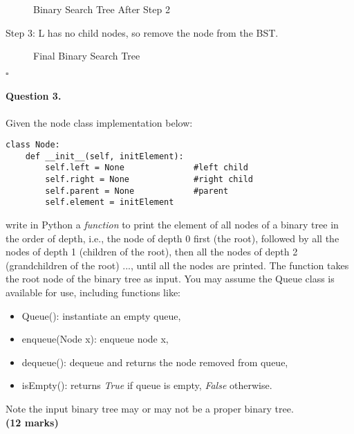 \documentclass[12pt]{article}
\newcommand{\EOQ}{\hfill $\square$}
\begin{document}
\begin{enumerate}[(a)]
\begin{figure}[H]
\begin{tikzpicture}
			\end{tikzpicture}
			\caption{Binary Search Tree After Step 2}
			\label{fig:BSTS2}
		\end{figure}
		Step 3: L has no child nodes, so remove the node from the BST.
		\begin{figure}[H]
					\centering
					\caption{Final Binary Search Tree}
					\label{fig:BSTF}
				\end{figure}\EOQ
\end{enumerate}
\newpage
\paragraph{Question 3.} Given the node class implementation below:
\begin{verbatim}
class Node:
    def __init__(self, initElement):
        self.left = None              #left child
        self.right = None             #right child
        self.parent = None            #parent
        self.element = initElement
\end{verbatim}
write in Python a \textit{function} to print the element of all nodes of a binary tree in the order of depth, i.e., the node of depth 0 first (the root), followed by all the nodes of depth 1 (children of the root), then all the nodes of depth 2 (grandchildren of the root) ..., until all the nodes are printed. The function takes the root node of the binary tree as input. You may assume the Queue class is available for use, including functions like:
\begin{itemize}
\item Queue(): instantiate an empty queue,
\item enqueue(Node x): enqueue node x,
\item dequeue(): dequeue and returns the node removed from queue,
\item isEmpty(): returns \textit{True} if queue is empty, \textit{False} otherwise.
\end{itemize}
Note the input binary tree may or may not be a proper binary tree. \\\text{}\hfill \textbf{(12 marks)}
\end{document}
